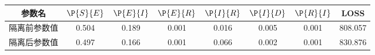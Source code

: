 \begin{tabular}{cccccccc}
\hline
参数名&$\P{S}{E}$&$\P{E}{I}$&$\P{E}{R}$&$\P{I}{R}$&$\P{I}{D}$&$\P{R}{I}$&LOSS\\
\hline
隔离前参数值&0.504&0.189&0.001&0.016&0.005&0.001&808.057\\
隔离后参数值&0.497&0.166&0.001&0.066&0.002&0.001&830.876\\
\hline
\end{tabular}